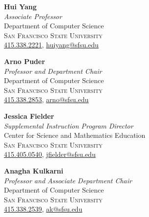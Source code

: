 \documentclass[hidelinks, 10.5pt]{article}
\def\contentwidth{0.9\linewidth}    %
\def\sectiontocontentspacing{4mm}   %
\begin{document}
{\vspace{\sectiontocontentspacing}

\begin{minipage}[ct]{\contentwidth}
    \begin{multicols}{2}
        \textbf{Hui Yang}\\
        \emph{Associate Professor}\\
        {Department of Computer Science}\\
        \textsc{San Francisco State University}\\
        \href{tel:4153382221}{415.338.2221}, \href{mailto:huiyang@sfsu.edu}{huiyang@sfsu.edu}\\

        \vspace{-1mm}

        \textbf{Arno Puder}\\
        \emph{Professor and Department Chair}\\
        {Department of Computer Science}\\
        \textsc{San Francisco State University}\\
        \href{tel:4153382853}{415.338.2853}, \href{mailto:arno@sfsu.edu}{arno@sfsu.edu}\\

        \vspace{-1mm}

        \textbf{Jessica Fielder}\\
        \emph{Supplemental Instruction Program Director}\\
        {Center for Science and Mathematics Education}\\
        \textsc{San Francisco State University}\\
        \href{tel:4154050540}{415.405.0540}, \href{mailto:jfielder@sfsu.edu}{jfielder@sfsu.edu}\\

        \columnbreak

        \textbf{Anagha Kulkarni}\\
        \emph{Professor and Associate Department Chair}\\
        {Department of Computer Science}\\
        \textsc{San Francisco State University}\\
        \href{tel:4153382539}{415.338.2539}, \href{mailto:ak@sfsu.edu}{ak@sfsu.edu}\\

        \vspace{-1mm}


\end{multicols}
\end{minipage}}
\end{document}
